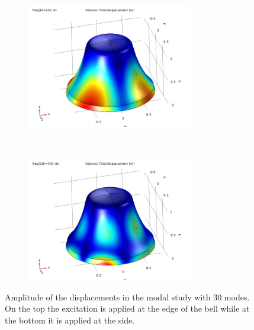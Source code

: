 \documentclass[a4paper]{article}
\begin{document}
\begin{figure}[h!]
	\begin{subfigure}{0.47\textwidth}
		\includegraphics[width=0.8\textwidth]{frequency modal study side/B1.png}
	\end{subfigure}
	~
	\begin{subfigure}{0.47\textwidth}
		\includegraphics[width=0.8\textwidth]{frequency modal study side/B2.png}
	\end{subfigure}
	\caption{Amplitude of the displacements in the modal study with 30 modes. On the top the excitation is applied at the edge of the bell while at the bottom it is applied at the side.}
	\label{fig:modal}
\end{figure}
\end{document}
